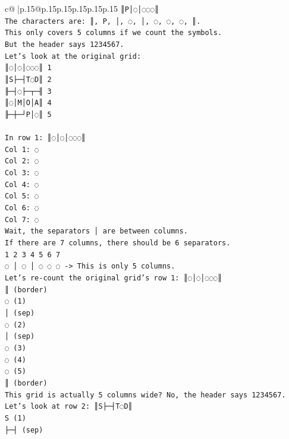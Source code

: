\documentclass{article}
\begin{document}
{\begin{supertabular}{c@{$\;$}|p{.15\linewidth}@{}p{.15\linewidth}p{.15\linewidth}p{.15\linewidth}p{.15\linewidth}p{.15\linewidth}}
{{{\texttt{║P│◌│◌◌◌║} \\
\texttt{The characters are: ║, P, │, ◌, │, ◌, ◌, ◌, ║.} \\
\texttt{This only covers 5 columns if we count the symbols.} \\
\texttt{But the header says 1234567.} \\
\texttt{Let's look at the original grid:} \\
\texttt{║◌│◌│◌◌◌║ 1} \\
\texttt{║S├─┤T◌D║ 2} \\
\texttt{╟─┤◌├─┬─╢ 3} \\
\texttt{║◌│M│O│A║ 4} \\
\texttt{╟─┼─┘P│◌║ 5} \\
\\ 
\texttt{In row 1: ║◌│◌│◌◌◌║} \\
\texttt{Col 1: ◌} \\
\texttt{Col 2: ◌} \\
\texttt{Col 3: ◌} \\
\texttt{Col 4: ◌} \\
\texttt{Col 5: ◌} \\
\texttt{Col 6: ◌} \\
\texttt{Col 7: ◌} \\
\texttt{Wait, the separators │ are between columns.} \\
\texttt{If there are 7 columns, there should be 6 separators.} \\
\texttt{1 2 3 4 5 6 7} \\
\texttt{◌ │ ◌ │ ◌ ◌ ◌ {-}> This is only 5 columns.} \\
\texttt{Let's re{-}count the original grid's row 1: ║◌│◌│◌◌◌║} \\
\texttt{║ (border)} \\
\texttt{◌ (1)} \\
\texttt{│ (sep)} \\
\texttt{◌ (2)} \\
\texttt{│ (sep)} \\
\texttt{◌ (3)} \\
\texttt{◌ (4)} \\
\texttt{◌ (5)} \\
\texttt{║ (border)} \\
\texttt{This grid is actually 5 columns wide? No, the header says 1234567.} \\
\texttt{Let's look at row 2: ║S├─┤T◌D║} \\
\texttt{S (1)} \\
\texttt{├─┤ (sep)} \\
}}}
\end{supertabular}}
\end{document}

